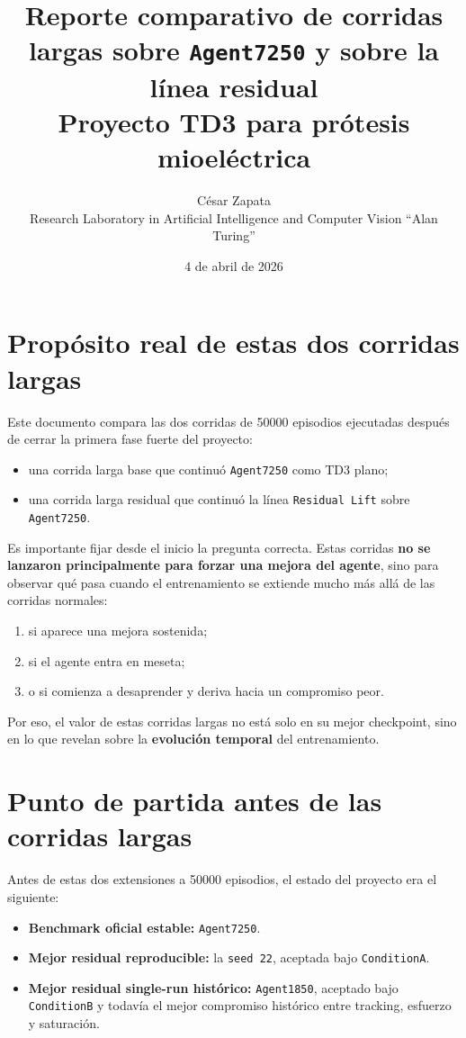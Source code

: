 \documentclass[11pt,a4paper]{article}
\title{Reporte comparativo de corridas largas sobre \texttt{Agent7250} y sobre la l\'inea residual\\\large Proyecto TD3 para pr\'otesis mioel\'ectrica}
\author{C\'esar Zapata\\Research Laboratory in Artificial Intelligence and Computer Vision ``Alan Turing''}
\date{4 de abril de 2026}
\begin{document}
\maketitle

\section*{Prop\'osito real de estas dos corridas largas}
Este documento compara las dos corridas de 50000 episodios ejecutadas despu\'es de cerrar la primera fase fuerte del proyecto:
\begin{itemize}
    \item una corrida larga base que continu\'o \texttt{Agent7250} como TD3 plano;
    \item una corrida larga residual que continu\'o la l\'inea \texttt{Residual Lift} sobre \texttt{Agent7250}.
\end{itemize}

Es importante fijar desde el inicio la pregunta correcta. Estas corridas \textbf{no se lanzaron principalmente para forzar una mejora del agente}, sino para observar qu\'e pasa cuando el entrenamiento se extiende mucho m\'as all\'a de las corridas normales:
\begin{enumerate}
    \item si aparece una mejora sostenida;
    \item si el agente entra en meseta;
    \item o si comienza a desaprender y deriva hacia un compromiso peor.
\end{enumerate}

Por eso, el valor de estas corridas largas no est\'a solo en su mejor checkpoint, sino en lo que revelan sobre la \textbf{evoluci\'on temporal} del entrenamiento.

\section*{Punto de partida antes de las corridas largas}
Antes de estas dos extensiones a 50000 episodios, el estado del proyecto era el siguiente:
\begin{itemize}
    \item \textbf{Benchmark oficial estable:} \texttt{Agent7250}.
    \item \textbf{Mejor residual reproducible:} la \texttt{seed 22}, aceptada bajo \texttt{ConditionA}.
    \item \textbf{Mejor residual single-run hist\'orico:} \texttt{Agent1850}, aceptado bajo \texttt{ConditionB} y todav\'ia el mejor compromiso hist\'orico entre tracking, esfuerzo y saturaci\'on.
\end{itemize}
\end{document}
